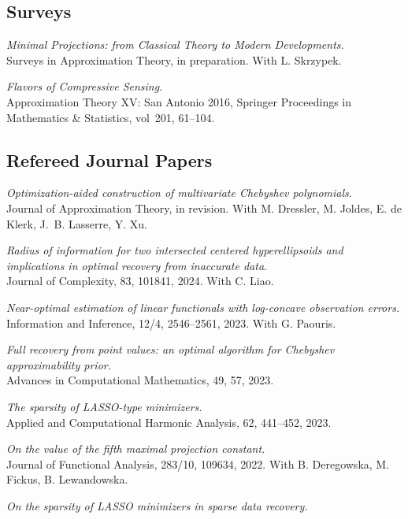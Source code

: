 \documentclass[11pt]{article}
\begin{document}
\subsection{Surveys}
\betaremune
\item {\sl Minimal Projections:
from Classical Theory to Modern Developments.}\\
Surveys in Approximation Theory, in preparation. With L. Skrzypek.
\item {\sl Flavors of Compressive Sensing}.\\
Approximation Theory XV: San Antonio 2016,
Springer Proceedings in Mathematics \& Statistics,
vol~201, 61--104. 
\eetaremune

\subsection{Refereed Journal Papers}
\betaremune
\item {\sl Optimization-aided construction of multivariate Chebyshev polynomials}.\\
Journal of Approximation Theory, in revision. With M.  Dressler, M.  Joldes, E. de Klerk, J.~B. Lasserre,  Y. Xu.
\item {\sl Radius of information for two intersected centered hyperellipsoids and implications in optimal recovery from inaccurate data}. \\
Journal of Complexity, 83, 101841, 2024. With C. Liao.
\item {\sl Near-optimal estimation of linear functionals with log-concave observation errors.}\\
Information and Inference, 12/4, 2546--2561, 2023.  
With G. Paouris.
\item {\sl Full recovery from point values: an optimal algorithm for Chebyshev approximability prior.}\\
Advances in Computational Mathematics,  49, 57, 2023.	
\item {\sl The sparsity of LASSO-type minimizers.}\\
Applied and Computational Harmonic Analysis, 62, 441--452, 2023.
\item {\sl On the value of the fifth maximal projection constant.}\\
Journal of Functional Analysis, 283/10, 109634, 2022.
With B. Deregowska, M. Fickus,  B. Lewandowska.
\item {\sl On the sparsity of LASSO minimizers in sparse data recovery.}\\
\end{document}
